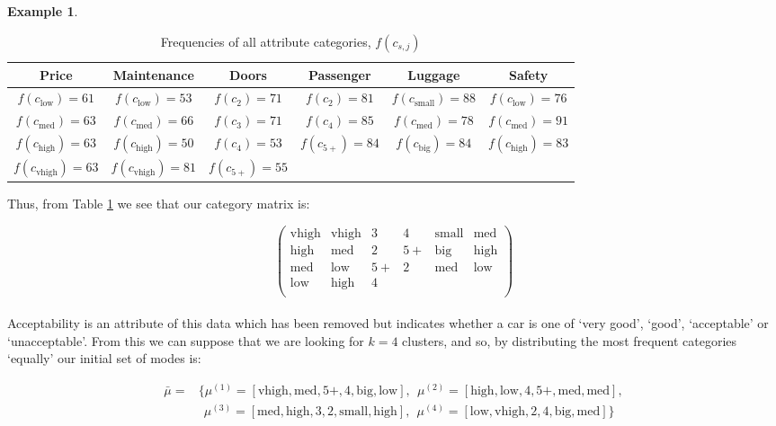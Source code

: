 \documentclass{article}
\theoremstyle{definition}
\newtheorem{example}{Example}
\begin{document}
\begin{example}
	\begin{table}[H]
		\centering
		\begin{tabular}{c|c|c|c|c|c}\label{table:2}
    		Price	&	Maintenance	&	Doors	&	Passenger	&	Luggage &	Safety	\\
    		\hline
    		$ f(c_{\text{low}}) = 61 $		&	$ f(c_{\text{low}}) = 53 $		&	$ f(c_{2}) = 71 $	   	&	$ f(c_{2}) = 81 $		&	$ f(c_{\text{small}}) = 88 $		&	$ f(c_{\text{low}}) = 76 $	\\
    		$ f(c_{\text{med}}) = 63 $		&	$ f(c_{\text{med}}) = 66 $		&	$ f(c_{3}) = 71 $		& 	$ f(c_{4}) = 85 $		&	$ f(c_{\text{med}}) = 78 $	&	$ f(c_{\text{med}}) = 91 $	\\
    		$ f(c_{\text{high}}) = 63 $		 &	 $ f(c_{\text{high}}) = 50 $		  &	  $ f(c_{4}) = 53 $	   &	$ f(c_{5+}) = 84 $	&	$ f(c_{\text{big}}) = 84 $	  &		$ f(c_{\text{high}}) = 83 $	\\
    		$ f(c_{\text{vhigh}}) = 63 $	&	$ f(c_{\text{vhigh}}) = 81 $	&	$ f(c_{5+}) = 55 $		&				{}					&					{}						&						{}					\\
		\end{tabular}
		\caption{Frequencies of all attribute categories, $f(c_{s,j})$}
	\end{table}

	Thus, from Table \ref{table:2} we see that our category matrix is:
	
	\[
	\begin{pmatrix}		
		\text{vhigh}	&	\text{vhigh}	&	3	&	4	&	\text{small}	&	\text{med}	\\
		\text{high}		&	\text{med}		&	2	&	5+	&	\text{big}	&	\text{high}		\\
		\text{med}		&	\text{low}		&	5+	&	2	&	\text{med}	&	\text{low}		\\
		\text{low}		&	\text{high}		&	4	&	{}	&			{}			&			{}			\\
	\end{pmatrix}
	\] \\
	
	
	Acceptability is an attribute of this data which has been removed but indicates whether a car is one of `very good', `good', `acceptable' or `unacceptable'. From this we can suppose that we are looking for $k = 4$ clusters, and so, by distributing the most frequent categories `equally' our initial set of modes is:
	
	\begin{equation}
	\begin{aligned}
	\bar{\mu} = & \{\mu^{(1)} = [\text{vhigh}, \text{med}, 5+, 4, \text{big}, \text{low}], \ \ \mu^{(2)} = [\text{high}, \text{low}, 4, 5+, \text{med}, \text{med}], \\
						  & \ \ \mu^{(3)} = [\text{med}, \text{high}, 3, 2, \text{small}, \text{high}], \ \ \mu^{(4)} = [\text{low}, \text{vhigh}, 2, 4, \text{big}, \text{med}] \} \\
	\end{aligned}
	\end{equation} \\
	

\end{example}
\end{document}
